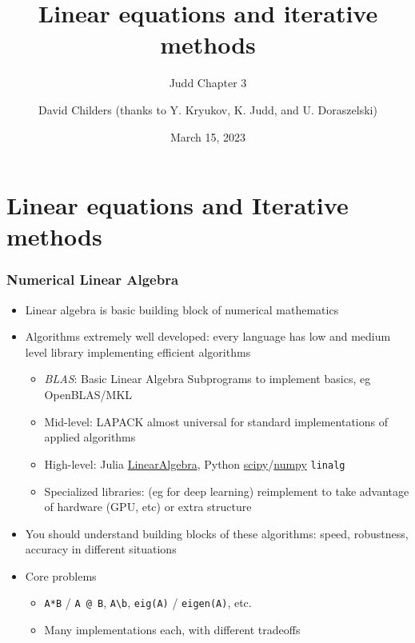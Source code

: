 \documentclass[bigger]{beamer}
\begin{document}
\title[47-809: Linear equations]{Linear equations and iterative methods}
\subtitle{Judd Chapter 3}
\author[David Childers]{David Childers (thanks to Y. Kryukov, K. Judd, and U. Doraszelski)}
\date[Mar-15]{ March 15, 2023}
\maketitle

\section{Linear equations and Iterative methods}

\begin{frame}
\frametitle{Numerical Linear Algebra}

\begin{itemize}

\item Linear algebra is basic building block of numerical mathematics
\item Algorithms extremely well developed: every language has low and medium level library implementing efficient algorithms
\begin{itemize}
\item \emph{BLAS}: Basic Linear Algebra Subprograms to implement basics, eg OpenBLAS/MKL 
\item Mid-level: LAPACK almost universal for standard implementations of applied algorithms
\item High-level: Julia \href{https://docs.julialang.org/en/v1/stdlib/LinearAlgebra/}{LinearAlgebra}, Python \href{https://docs.scipy.org/doc/scipy/reference/linalg.html}{scipy}/\href{https://numpy.org/devdocs/reference/routines.linalg.html}{numpy} \texttt{linalg} 
\item Specialized libraries: (eg for deep learning) reimplement to take advantage of hardware (GPU, etc) or extra structure
\end{itemize}

\item You should understand building blocks of these algorithms: speed, robustness, accuracy in different situations
\item Core problems 
  \begin{itemize}
     \item \texttt{A*B} / \texttt{A @ B}, \texttt{A\textbackslash b}, \texttt{eig(A)} / \texttt{eigen(A)}, etc. 
    \item Many implementations each, with different tradeoffs
  \end{itemize}

\end{itemize}


\end{frame}
\end{document}
